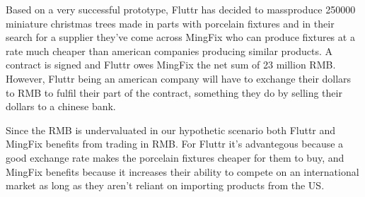 \documentclass[11pt]{article}
\begin{document}

Based on a very successful prototype, Fluttr has decided to massproduce 
250000 miniature christmas trees made in parts with porcelain fixtures 
and in their search for a supplier they've come across MingFix who can 
produce fixtures at a rate much cheaper than american companies 
producing similar products.  A contract is signed and Fluttr owes 
MingFix the net sum of 23 million RMB. However, Fluttr being an american 
company will have to exchange their dollars to RMB to fulfil their part 
of the contract, something they do by selling their dollars to a chinese 
bank.


Since the RMB is undervaluated in our hypothetic scenario both Fluttr 
and MingFix benefits from trading in RMB. For Fluttr it's advantegous 
because a good exchange rate makes the porcelain fixtures cheaper for 
them to buy, and MingFix benefits because it increases their ability to 
compete on an international market as long as they aren't reliant on 
importing products from the US.

\end{document}
